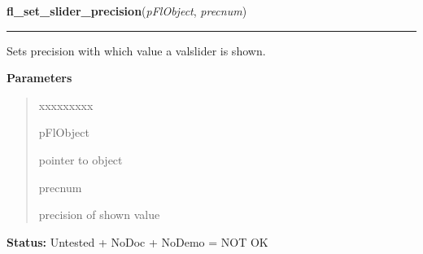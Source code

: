 \hspace{.8\funcindent}\begin{boxedminipage}{\funcwidth}

    \raggedright \textbf{fl\_set\_slider\_precision}(\textit{pFlObject}, \textit{precnum})

    \vspace{-1.5ex}

    \rule{\textwidth}{0.5\fboxrule}
\setlength{\parskip}{2ex}
    Sets precision with which value a valslider is shown.

\setlength{\parskip}{1ex}
      \textbf{Parameters}
      \vspace{-1ex}

      \begin{quote}
        \begin{Ventry}{xxxxxxxxx}

          \item[pFlObject]

          pointer to object

          \item[precnum]

          precision of shown value

        \end{Ventry}

      \end{quote}

\textbf{Status:} Untested + NoDoc + NoDemo = NOT OK



    \end{boxedminipage}

    \label{xformslib:flslider:fl_set_slider_filter}

    \vspace{0.5ex}

